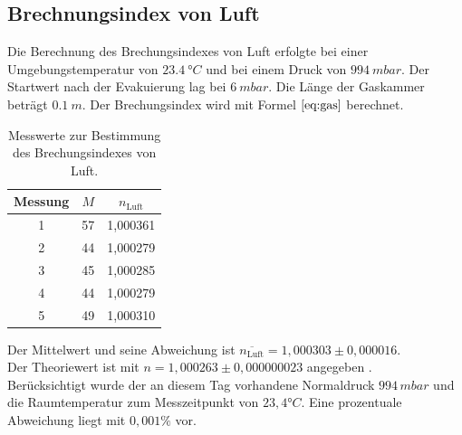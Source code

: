 \subsection{Brechnungsindex von Luft}
Die Berechnung des Brechungsindexes von Luft erfolgte bei einer Umgebungstemperatur von $\SI{23,4}{°C}$ und bei einem Druck von $\SI{994}{mbar}$.
Der Startwert nach der Evakuierung lag bei $\SI{6}{mbar}$.
Die Länge der Gaskammer beträgt $\SI{0,1}{m}$.
Der Brechungsindex wird mit Formel $\ref{eq:gas}$ berechnet.
\begin{table}[H]
\centering
\begin{tabular}{c c c}
{Messung} & {$M$} & {$n_\text{Luft}$} \\
\midrule
1 & 57 & 1,000361 \\
2 & 44 & 1,000279 \\
3 & 45 & 1,000285 \\
4 & 44 & 1,000279 \\
5 & 49 & 1,000310 \\
\end{tabular}
\caption{Messwerte zur Bestimmung des Brechungsindexes von Luft.}
\label{tab:luft}
\end{table}
Der Mittelwert und seine Abweichung ist $\overline{n_\text{Luft}}= 1,000303 \pm 0,000016$.\\
Der Theoriewert ist mit $n=1,000263 \pm 0,000000023$ angegeben \cite{brechglas2}.\\
Berücksichtigt wurde der an diesem Tag vorhandene Normaldruck $994\, mbar$ und die Raumtemperatur zum Messzeitpunkt von $23,4°C$.
Eine prozentuale Abweichung liegt mit $0,001\%$ vor.
